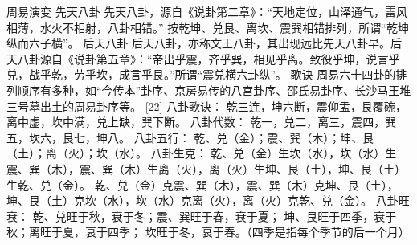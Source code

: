 \documentclass[12pt,UTF8]{ctexbook}
\begin{document}
周易演变
先天八卦
先天八卦，源自《说卦第二章》：“天地定位，山泽通气，雷风相薄，水火不相射，八卦相错。”
按乾坤、兑艮、离坎、震巽相错排列，所谓“乾坤纵而六子横”。
后天八卦
后天八卦，亦称文王八卦，其出现远比先天八卦早。后天八卦源自《说卦第五章》：“帝出乎震，齐乎巽，相见乎离。致役乎坤，说言乎兑，战乎乾，劳乎坎，成言乎艮。”所谓“震兑横六卦纵”。
歌诀
周易六十四卦的排列顺序有多种，如“今传本”卦序、京房易传的八宫卦序、邵氏易卦序、长沙马王堆三号墓出土的周易卦序等。 [22]
八卦歌诀：
乾三连，坤六断，震仰盂，艮覆碗，离中虚，坎中满，兑上缺，巽下断。
八卦代数：
乾一，兑二，离三，震四，巽五，坎六，艮七，坤八。
八卦五行：
乾、兑（金）；震、巽（木）；坤、艮（土）；离（火）；坎（水）。
八卦生克：
乾、兑（金）生坎（水），坎（水）生震、巽（木），震、巽（木）生离（火），离（火）生坤、艮（土），坤、艮（土）生乾、兑（金）。
乾、兑（金）克震、巽（木），震、巽（木）克坤、艮（土），坤、艮（土）克坎（水），坎（水）克离（火），离（火）克乾、兑（金）。
八卦旺衰：
乾、兑旺于秋，衰于冬；震、巽旺于春，衰于夏；
坤、艮旺于四季，衰于秋；离旺于夏，衰于四季；
坎旺于冬，衰于春。（四季是指每个季节的后一个月）
\end{document}
